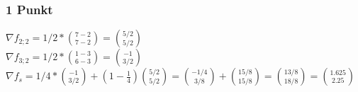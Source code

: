 \subsubsection{1 Punkt}

$\nabla f_{2;2} = 1/2 * \binom{7 - 2}{7 - 2} = \binom{5/2}{5/2}$\\
$\nabla f_{3;2} = 1/2 * \binom{1 - 3}{6 - 3} = \binom{-1}{3/2}$\\
$\nabla f_s = 1/4 * \binom{-1}{3/2} + (1 - \frac{1}{4})\binom{5/2}{5/2} = \binom{-1/4}{3/8} + \binom{15/8}{15/8} = \binom{13/8}{18/8} = \binom{1.625}{2.25}$